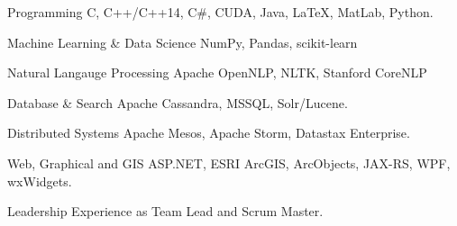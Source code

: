 


\begin{cvskills}


\cvskill
{Programming} %
{C, C++/C++14, C\#, CUDA, Java, \LaTeX, MatLab, Python.} %


\cvskill
{Machine Learning \& Data Science} %
{NumPy, Pandas, scikit-learn} %


\cvskill
{Natural Langauge Processing} %
{Apache OpenNLP, NLTK, Stanford CoreNLP} %


\cvskill
{Database \& Search} %
{Apache Cassandra, MSSQL, Solr/Lucene.} %


\cvskill
{Distributed Systems} %
{Apache Mesos, Apache Storm, Datastax Enterprise.} %


\cvskill
{Web, Graphical and GIS} %
{ASP.NET, ESRI ArcGIS, ArcObjects, JAX-RS, WPF, wxWidgets.} %


\cvskill
{Leadership} %
{Experience as Team Lead and Scrum Master.} %


\end{cvskills}